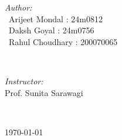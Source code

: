 \begin{titlepage}
\begin{minipage}{0.4\textwidth}
\begin{flushleft} \large
\emph{Author:}\\
\ Arijeet Mondal : 24m0812\\
\ Daksh Goyal : 24m0756\\
\ Rahul Choudhary : 200070065\\


\end{flushleft}
\end{minipage}
~
\begin{minipage}{0.4\textwidth}
\begin{flushright} \large
\emph{Instructor:} \\
 Prof. Sunita Sarawagi\\ %
\end{flushright}
\end{minipage}\\[2cm]
\makeatother



{\large \today}\\[2cm] %

\vfill %

\end{titlepage}